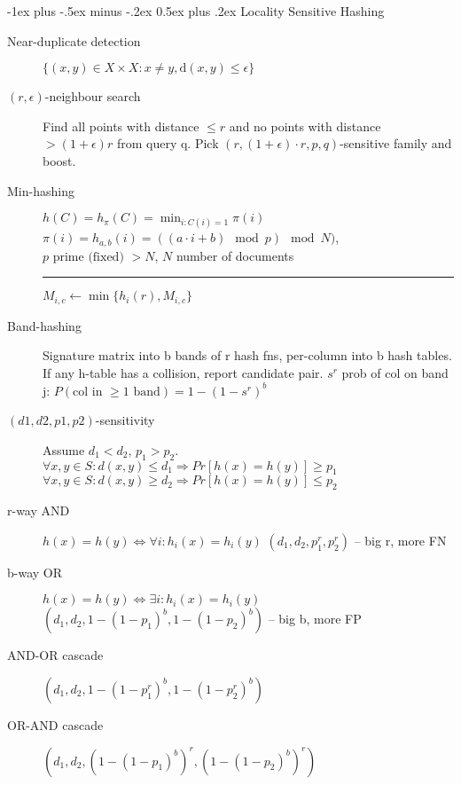 \documentclass[11pt,landscape]{article}
\makeatletter
\renewcommand{\section}{\@startsection{section}{1}{0mm}%
                                {-1ex plus -.5ex minus -.2ex}%
                                {0.5ex plus .2ex}%
                                {\normalfont\normalsize\bfseries}}
\makeatother
\begin{document}
\begin{multicols}{3}
\section{Locality Sensitive Hashing}
    \begin{description}
        \item[Near-duplicate detection] $ \{ (x,y) \in X \times X : x \neq y, \text{d}(x,y) \leq \epsilon \}$
        \item[$(r,\epsilon)$-neighbour search]
        Find all points with distance $\leq r$ and no points with distance $> (1+ \epsilon)r$ from query q.
        Pick $(r,(1+\epsilon) \cdot r,p,q)$-sensitive family and boost.
        \item[Min-hashing] $h(C) = h_{\pi}(C) = \min_{i : C(i) = 1} \pi(i)$
            \subitem $\pi(i) = h_{a, b}(i) = ((a \cdot i + b) \mod p) \mod N)$,
        $p \text{ prime (fixed) } > N$, $N$ number of documents
            \hrule
            \begin{algorithmic}[1]
                \State $M_{i,c} \gets \min\{h_i(r), M_{i,c}\}$
            \EndFor
        \EndIf
    \EndFor
\EndFor
\end{algorithmic}
        \item[Band-hashing] Signature matrix into b bands of r hash fns,
            per-column into b hash tables. If any h-table has a collision,
            report candidate pair. $s^r$ prob of col on band j: $P(\text{col in } \geq 1 \text{ band}) = 1-(1-s^r)^b$
        \item[$(d1,d2,p1,p2)$-sensitivity] Assume $d_1<d_2$, $p_1>p_2$.
                $\forall x,y \in S: d(x,y) \leq d_1 \Rightarrow Pr[h(x)=h(y)] \geq p_1$\\
                $\forall x,y \in S: d(x,y) \geq d_2 \Rightarrow Pr[h(x)=h(y)] \leq p_2$
        \item[r-way AND] $h(x)=h(y) \iff \forall i : h_i(x)=h_i(y)$
            $(d_1,d_2,p_1^r,p_2^r)$ -- big r, more FN
        \item[b-way OR] $h(x)=h(y) \iff \exists i : h_i(x)=h_i(y)$
            $(d_1,d_2,1-(1-p_1)^b,1-(1-p_2)^b)$ -- big b, more FP
        \item[AND-OR cascade] $(d_1,d_2,1-(1-p_1^r)^b,1-(1-p_2^r)^b)$
        \item[OR-AND cascade] $(d_1,d_2,(1-(1-p_1)^b)^r,(1-(1-p_2)^b)^r)$
    \end{description}

\end{multicols}
\end{document}
